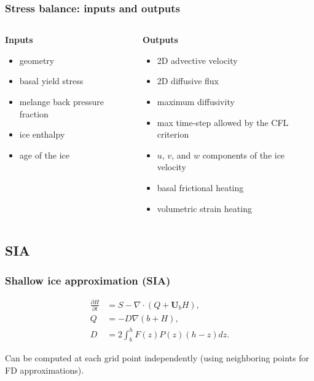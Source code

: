 \documentclass[hide notes,intlimits]{beamer}
\begin{document}
\begin{frame}
  \frametitle{Stress balance: inputs and outputs}

  \begin{columns}[t]
    \begin{column}{0.5\linewidth}
      \textbf{Inputs}

      \begin{itemize}
      \item geometry
      \item basal yield stress
      \item melange back pressure fraction
      \item ice enthalpy
      \item age of the ice
      \end{itemize}
    \end{column}
    \begin{column}{0.5\linewidth}
      \textbf{Outputs}

      \begin{itemize}
      \item 2D advective velocity
      \item 2D diffusive flux
      \item maximum diffusivity
      \item max time-step allowed by the CFL criterion
      \item $u$, $v$, and $w$ components of the ice velocity
      \item basal frictional heating
      \item volumetric strain heating
      \end{itemize}
    \end{column}
  \end{columns}

\end{frame}

\subsection{SIA}
\label{sec:sia}

\begin{frame}
  \frametitle{Shallow ice approximation (SIA)}

  \begin{align}
    \label{eq:2}
    \frac{\partial H}{\partial t} &= S - \nabla \cdot (Q + \mathbf{U}_b H),\\
    Q &= -D \nabla (b + H),\\
    D &= 2\int_b^h F(z)P(z)(h-z)dz.
  \end{align}

  Can be computed at each grid point independently (using neighboring
  points for FD approximations).

\end{frame}
\end{document}
